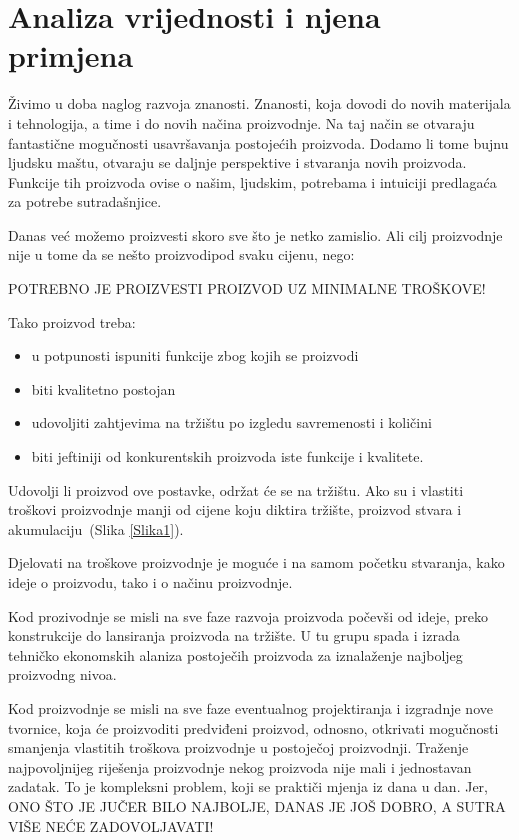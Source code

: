 \documentclass[a4paper,12pt]{article}
\numberwithin{figure}{section}
\begin{document}
\section*{Analiza vrijednosti i njena primjena}
Živimo u doba naglog razvoja znanosti. Znanosti, koja dovodi do novih materijala i tehnologija, a time i do novih načina proizvodnje. Na taj način se otvaraju fantastične mogučnosti usavršavanja postojećih proizvoda. Dodamo li tome bujnu ljudsku maštu, otvaraju se daljnje perspektive i stvaranja novih proizvoda. Funkcije tih proizvoda ovise o našim, ljudskim, potrebama i intuiciji predlagaća za potrebe sutradašnjice.\par
Danas već možemo proizvesti skoro sve što je netko zamislio. Ali cilj proizvodnje nije u tome da se nešto proizvodipod svaku cijenu, nego:
\begin{center}
POTREBNO JE PROIZVESTI PROIZVOD UZ MINIMALNE TROŠKOVE!
\end{center}
\noindent Tako proizvod treba:
\begin{itemize}
	\item u potpunosti ispuniti funkcije zbog kojih se proizvodi
	\item biti kvalitetno postojan
	\item udovoljiti zahtjevima na tržištu po izgledu savremenosti i količini
	\item biti jeftiniji od konkurentskih proizvoda iste funkcije i kvalitete.
\end{itemize}
\noindent Udovolji li proizvod ove postavke, održat će se na tržištu. Ako su i vlastiti troškovi proizvodnje manji od cijene koju diktira tržište, proizvod stvara i akumulaciju~(Slika \ref{Slika1}). \par
Djelovati na troškove proizvodnje je moguće i na samom početku stvaranja, kako ideje o proizvodu, tako i o načinu proizvodnje. \par
Kod prozivodnje se misli na sve faze razvoja proizvoda počevši od ideje, preko konstrukcije do lansiranja proizvoda na tržište. U tu grupu spada i izrada tehničko ekonomskih alaniza postoječih proizvoda za iznalaženje najboljeg proizvodng nivoa. \par
Kod proizvodnje se misli na sve faze eventualnog projektiranja i izgradnje nove tvornice, koja će proizvoditi predviđeni proizvod, odnosno, otkrivati mogučnosti smanjenja vlastitih troškova proizvodnje u postoječoj proizvodnji. Traženje najpovoljnijeg riješenja proizvodnje nekog proizvoda nije mali i jednostavan zadatak. To je kompleksni problem, koji se praktiči mjenja iz dana u dan. Jer, ONO ŠTO JE JUČER BILO NAJBOLJE, DANAS JE JOŠ DOBRO, A SUTRA VIŠE NEĆE ZADOVOLJAVATI!
\end{document}
